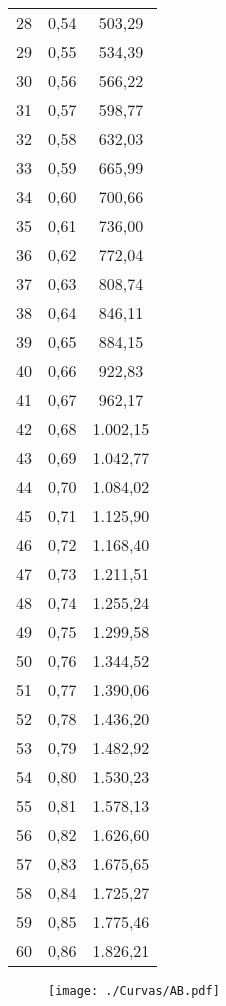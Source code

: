 \documentclass[]{article}
\begin{document}
\begin{longtable}[t]{ccc}
28 & 0,54 & 503,29\\
29 & 0,55 & 534,39\\
30 & 0,56 & 566,22\\
31 & 0,57 & 598,77\\
32 & 0,58 & 632,03\\
33 & 0,59 & 665,99\\
34 & 0,60 & 700,66\\
35 & 0,61 & 736,00\\
36 & 0,62 & 772,04\\
37 & 0,63 & 808,74\\
38 & 0,64 & 846,11\\
39 & 0,65 & 884,15\\
40 & 0,66 & 922,83\\
41 & 0,67 & 962,17\\
42 & 0,68 & 1.002,15\\
43 & 0,69 & 1.042,77\\
44 & 0,70 & 1.084,02\\
45 & 0,71 & 1.125,90\\
46 & 0,72 & 1.168,40\\
47 & 0,73 & 1.211,51\\
48 & 0,74 & 1.255,24\\
49 & 0,75 & 1.299,58\\
50 & 0,76 & 1.344,52\\
51 & 0,77 & 1.390,06\\
52 & 0,78 & 1.436,20\\
53 & 0,79 & 1.482,92\\
54 & 0,80 & 1.530,23\\
55 & 0,81 & 1.578,13\\
56 & 0,82 & 1.626,60\\
57 & 0,83 & 1.675,65\\
58 & 0,84 & 1.725,27\\
59 & 0,85 & 1.775,46\\
60 & 0,86 & 1.826,21\\*
\end{longtable}

\clearpage

\begin{sidewaysfigure}[htb]
   \centering
   \texttt{[image: ./Curvas/AB.pdf]}
\end{sidewaysfigure}

\clearpage
\end{document}
